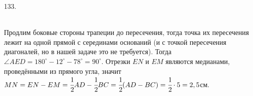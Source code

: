 133. \begin{figure}[ht!]
\end{figure}\\
Продлим боковые стороны трапеции до пересечения, тогда точка их пересечения лежит на одной прямой с серединами оснований (и с точкой пересечения диагоналей, но в нашей задаче это не требуется). Тогда $\angle AED=180^\circ-12^\circ-78^\circ=90^\circ.$ Отрезки $EN$ и $EM$ являются медианами, проведёнными из прямого угла, значит $MN=EN-EM=\cfrac{1}{2}AD-\cfrac{1}{2}BC=\cfrac{1}{2}(AD-BC)=\cfrac{1}{2}\cdot5=2,5$см.\newpage\noindent
